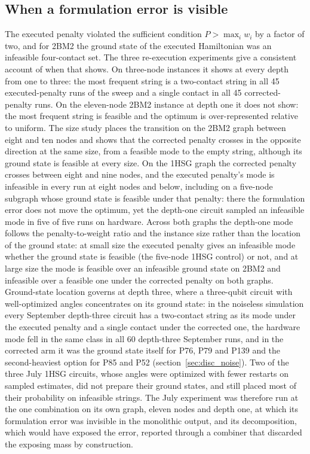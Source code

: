 \documentclass{iopjournal}
\begin{document}
\subsection{When a formulation error is visible}
\label{sec:disc_visibility}
The executed penalty violated the sufficient condition $P > \max_i w_i$ by a factor of two, and for 2BM2 the ground state of the executed Hamiltonian was an infeasible four-contact set. The three re-execution experiments give a consistent account of when that shows. On three-node instances it shows at every depth from one to three: the most frequent string is a two-contact string in all 45 executed-penalty runs of the sweep and a single contact in all 45 corrected-penalty runs. On the eleven-node 2BM2 instance at depth one it does not show: the most frequent string is feasible and the optimum is over-represented relative to uniform. The size study places the transition on the 2BM2 graph between eight and ten nodes and shows that the corrected penalty crosses in the opposite direction at the same size, from a feasible mode to the empty string, although its ground state is feasible at every size. On the 1HSG graph the corrected penalty crosses between eight and nine nodes, and the executed penalty's mode is infeasible in every run at eight nodes and below, including on a five-node subgraph whose ground state is feasible under that penalty: there the formulation error does not move the optimum, yet the depth-one circuit sampled an infeasible mode in five of five runs on hardware. Across both graphs the depth-one mode follows the penalty-to-weight ratio and the instance size rather than the location of the ground state: at small size the executed penalty gives an infeasible mode whether the ground state is feasible (the five-node 1HSG control) or not, and at large size the mode is feasible over an infeasible ground state on 2BM2 and infeasible over a feasible one under the corrected penalty on both graphs. Ground-state location governs at depth three, where a three-qubit circuit with well-optimized angles concentrates on its ground state: in the noiseless simulation every September depth-three circuit has a two-contact string as its mode under the executed penalty and a single contact under the corrected one, the hardware mode fell in the same class in all 60 depth-three September runs, and in the corrected arm it was the ground state itself for P76, P79 and P139 and the second-heaviest option for P85 and P52 (section~\ref{sec:disc_noise}). Two of the three July 1HSG circuits, whose angles were optimized with fewer restarts on sampled estimates, did not prepare their ground states, and still placed most of their probability on infeasible strings. The July experiment was therefore run at the one combination on its own graph, eleven nodes and depth one, at which its formulation error was invisible in the monolithic output, and its decomposition, which would have exposed the error, reported through a combiner that discarded the exposing mass by construction.
\end{document}
